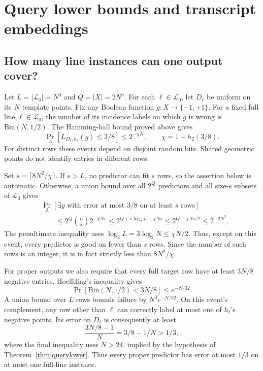 \documentclass[11pt,letterpaper,pmlr,twoside]{jmlr}
\newcommand{\Lc}{\mathcal L}
\newcommand{\err}{L}
\newcommand{\ceil}[1]{\lceil #1\rceil}
\newcommand{\hbin}{h_2}
\begin{document}
\section{Query lower bounds and transcript embeddings}
\label{app:query}
\subsection{How many line instances can one output cover?}
Let $L=|\Lc_0|=N^3$ and $Q=|X|=2N^3$. For each $\ell\in\Lc_0$, let $D_\ell$ be uniform on its $N$ template points. Fix any Boolean function $g:X\to\{-1,+1\}$. For a fixed full line $\ell\in\Lc_0$, the number of its incidence labels on which $g$ is wrong is $\mathrm{Bin}(N,1/2)$. The Hamming-ball bound proved above gives
\begin{equation}
 \Pr_A[\err_{D_\ell,h_\ell}(g)\le3/8]\le2^{-\chi N},
 \qquad \chi=1-\hbin(3/8).
\label{eq:fixed-output}
\end{equation}
For distinct rows these events depend on disjoint random bits. Shared geometric points do not identify entries in different rows.

Set $s=\ceil{8N^2/\chi}$. If $s>L$, no predictor can fit $s$ rows, so the assertion below is automatic. Otherwise, a union bound over all $2^Q$ predictors and all size-$s$ subsets of $\Lc_0$ gives
\begin{align*}
 &\Pr_A[\exists g\text{ with error at most }3/8\text{ on at least }s\text{ rows}]\\
 &\hspace{2em}\le2^Q\binom Ls2^{-\chi Ns}
 \le2^{Q+s\log_2L-\chi Ns}
 \le2^{Q-\chi Ns/2}
 \le2^{-2N^3}.
\end{align*}
The penultimate inequality uses $\log_2L=3\log_2N\le\chi N/2$. Thus, except on this event, every predictor is good on fewer than $s$ rows. Since the number of such rows is an integer, it is in fact strictly less than $8N^2/\chi$.

For proper outputs we also require that every full target row have at least $3N/8$ negative entries. Hoeffding's inequality \citep{Hoeffding63} gives
\[
 \Pr[\mathrm{Bin}(N,1/2)<3N/8]\le e^{-N/32}.
\]
A union bound over $L$ rows bounds failure by $N^3e^{-N/32}$. On this event's complement, any row other than $\ell$ can correctly label at most one of $h_\ell$'s negative points. Its error on $D_\ell$ is consequently at least
\[
 \frac{3N/8-1}{N}=3/8-1/N>1/3,
\]
where the final inequality uses $N>24$, implied by the hypothesis of Theorem~\ref{thm:querylower}. Thus every proper predictor has error at most $1/3$ on at most one full-line instance.
\end{document}
